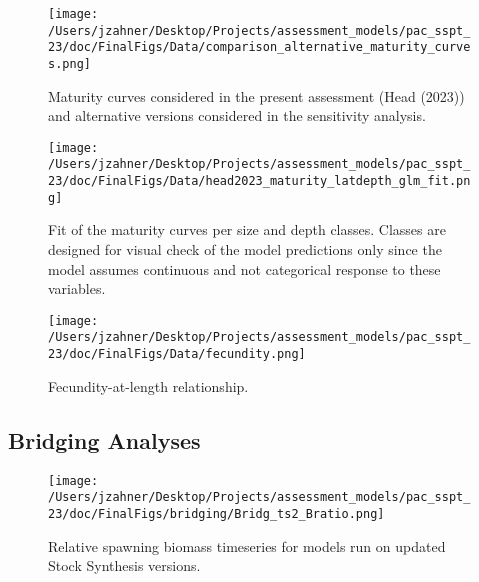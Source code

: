 \documentclass[11pt,
  letterpaper,
]{article}
\begin{document}
\begin{figure}
{\centering
\texttt{[image: /Users/jzahner/Desktop/Projects/assessment\_models/pac\_sspt\_23/doc/FinalFigs/Data/comparison\_alternative\_maturity\_curves.png]}
}
\caption{Maturity curves considered in the present assessment (Head (2023)) and alternative versions considered in the sensitivity analysis.\label{fig:mat2}}
\end{figure}

\begin{figure}
{\centering
\texttt{[image: /Users/jzahner/Desktop/Projects/assessment\_models/pac\_sspt\_23/doc/FinalFigs/Data/head2023\_maturity\_latdepth\_glm\_fit.png]}
}
\caption{Fit of the maturity curves per size and depth classes. Classes are designed for visual check of the model predictions only since the model assumes continuous and not categorical response to these variables.\label{fig:mat1}}
\end{figure}

\begin{figure}
{\centering
\texttt{[image: /Users/jzahner/Desktop/Projects/assessment\_models/pac\_sspt\_23/doc/FinalFigs/Data/fecundity.png]}
}
\caption{Fecundity-at-length relationship.\label{fig:fec}}
\end{figure}

\clearpage

\hypertarget{bridging-analyses}{%
\subsection{Bridging Analyses}\label{bridging-analyses}}

\begin{figure}
{\centering
\texttt{[image: /Users/jzahner/Desktop/Projects/assessment\_models/pac\_sspt\_23/doc/FinalFigs/bridging/Bridg\_ts2\_Bratio.png]}
}
\caption{Relative spawning biomass timeseries for models run on updated Stock Synthesis versions.\label{fig:bridge_bratio}}
\end{figure}
\end{document}
